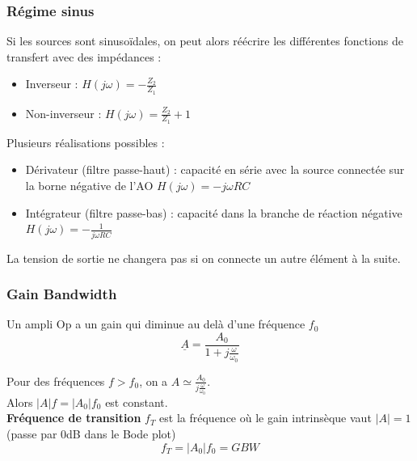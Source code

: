 \documentclass[../main.tex]{subfiles}
\begin{document}
\subsubsection{Régime sinus}
Si les sources sont sinusoïdales, on peut alors réécrire les différentes fonctions de transfert avec des impédances : \begin{itemize}
    \item Inverseur : $H(j\omega) = -\frac{Z_2}{Z_1}$\\
    \item Non-inverseur : $H(j\omega) = \frac{Z_2}{Z_1}+1$\\
\end{itemize}

Plusieurs réalisations possibles : \begin{itemize}
    \item Dérivateur (filtre passe-haut) : capacité en série avec la source connectée sur la borne négative de l'AO $H(j\omega) = -j\omega RC$\\
    \item Intégrateur (filtre passe-bas) : capacité dans la branche de réaction négative $H(j\omega) = -\frac{1}{j\omega RC}$\\
\end{itemize}

\warning La tension de sortie ne changera pas si on connecte un autre élément à la suite. 

\subsubsection{Gain Bandwidth}
Un ampli Op a un gain qui diminue au delà d'une fréquence $f_0$\begin{equation}
    \underline{A} = \frac{A_0}{1+j\frac{\omega}{\omega_0}}
\end{equation}

Pour des fréquences $f>f_0$, on a $A\simeq \frac{A_0}{j\frac{\omega}{\omega_0}}$.\\

Alors $\lvert A\rvert f = \lvert A_0 \rvert f_0$ est constant.\\

\textbf{Fréquence de transition} $f_T$ est la fréquence où le gain intrinsèque vaut $\lvert A\rvert =1$ (passe par 0dB dans le Bode plot)\\
\begin{equation}
    f_T=\lvert A_0\rvert f_0 = GBW
\end{equation}
\end{document}
